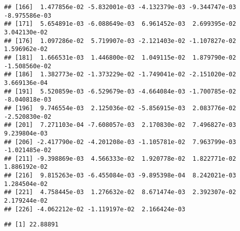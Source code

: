 \documentclass[
]{article}
\newenvironment{Shaded}{\begin{snugshade}}{\end{snugshade}}
\newcommand{\CommentTok}[1]{\textcolor[rgb]{0.56,0.35,0.01}{\textit{#1}}}
\newcommand{\DecValTok}[1]{\textcolor[rgb]{0.00,0.00,0.81}{#1}}
\newcommand{\KeywordTok}[1]{\textcolor[rgb]{0.13,0.29,0.53}{\textbf{#1}}}
\newcommand{\NormalTok}[1]{#1}
\newcommand{\OperatorTok}[1]{\textcolor[rgb]{0.81,0.36,0.00}{\textbf{#1}}}
\newcommand{\StringTok}[1]{\textcolor[rgb]{0.31,0.60,0.02}{#1}}
\begin{document}
\begin{verbatim}
## [166]  1.477856e-02 -5.832001e-03 -4.132379e-03 -9.344747e-03 -8.975586e-03
## [171]  5.654891e-03 -6.088649e-03  6.961452e-03  2.699395e-02  3.042130e-02
## [176]  1.097286e-02  5.719907e-03 -2.121403e-02 -1.107827e-02  1.596962e-02
## [181]  1.666531e-03  1.446800e-02  1.049115e-02  1.879790e-02 -1.508560e-02
## [186]  1.382773e-02 -1.373229e-02 -1.749041e-02 -2.151020e-02  3.669136e-04
## [191]  5.520859e-03 -6.529679e-03 -4.664084e-03 -1.700785e-02 -8.040818e-03
## [196]  9.746554e-03  2.125036e-02 -5.856915e-03  2.083776e-02 -2.520830e-02
## [201]  7.271103e-04 -7.608057e-03  2.170830e-02  7.496827e-03  9.239804e-03
## [206] -2.417790e-02 -4.201208e-03 -1.105781e-02  7.963799e-03 -1.021485e-02
## [211] -9.398869e-03  4.566333e-02  1.920778e-02  1.822771e-02  1.886192e-02
## [216]  9.815263e-03 -6.455084e-03 -9.895398e-04  8.242021e-03  1.284504e-02
## [221]  4.758445e-03  1.276632e-02  8.671474e-03  2.392307e-02  2.179244e-02
## [226] -4.062212e-02 -1.119197e-02  2.166424e-03
\end{verbatim}

\begin{Shaded}
\end{Shaded}

\begin{verbatim}
## [1] 22.88891
\end{verbatim}
\end{document}
